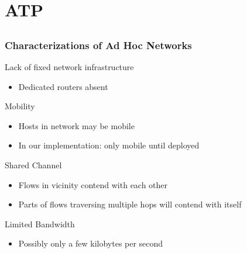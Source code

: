\section{ATP}
\subsection*{}


\begin{frame}[t]
  \frametitle{Characterizations of Ad Hoc Networks}
  
  Lack of fixed network infrastructure
  \begin{itemize}
  \item Dedicated routers absent
  \end{itemize}

  \vfill
  
  Mobility
  \begin{itemize}
  \item Hosts in network may be mobile
  \item In our implementation: only mobile until deployed
  \end{itemize}

  \vfill

  Shared Channel
  \begin{itemize}
  \item Flows in vicinity contend with each other
  \item Parts of flows traversing multiple hops will contend with itself
  \end{itemize}

  \vfill

  Limited Bandwidth
  \begin{itemize}
  \item Possibly only a few kilobytes per second
  \end{itemize}

  \vfill

  \begin{flushleft}
    \begin{tiny}
      \begin{minipage}{1.0\linewidth}
      \end{minipage}
    \end{tiny}
  \end{flushleft}
  
\end{frame}

